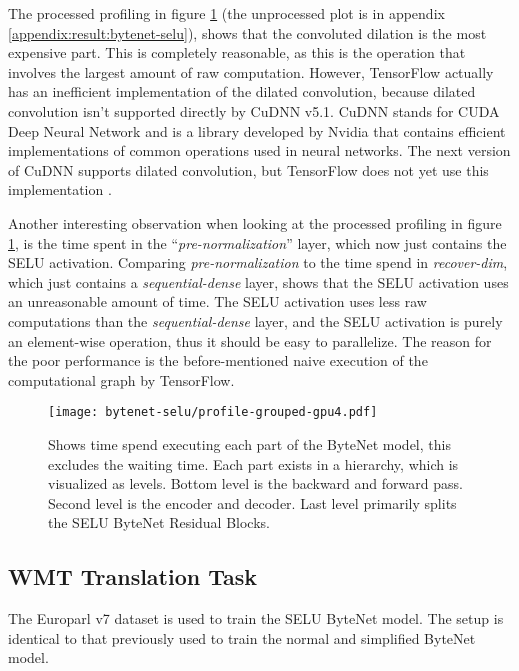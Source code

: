 The processed profiling in figure \ref{fig:result:selu-bytenet:profile-grouped} (the unprocessed plot is in appendix \ref{appendix:result:bytenet-selu}), shows that the convoluted dilation is the most expensive part. This is completely reasonable, as this is the operation that involves the largest amount of raw computation. However, TensorFlow actually has an inefficient implementation of the dilated convolution, because dilated convolution isn't supported directly by CuDNN v5.1. CuDNN stands for CUDA Deep Neural Network and is a library developed by Nvidia that contains efficient implementations of common operations used in neural networks. The next version of CuDNN supports dilated convolution, but TensorFlow does not yet use this implementation \cite{nvidia-cudnn}.

Another interesting observation when looking at the processed profiling in figure \ref{fig:result:selu-bytenet:profile-grouped}, is the time spent in the ``\textit{pre-normalization}'' layer, which now just contains the SELU activation. Comparing \textit{pre-normalization} to the time spend in \textit{recover-dim}, which just contains a \textit{sequential-dense} layer, shows that the SELU activation uses an unreasonable amount of time. The SELU activation uses less raw computations than the \textit{sequential-dense} layer, and the SELU activation is purely an element-wise operation, thus it should be easy to parallelize. The reason for the poor performance is the before-mentioned naive execution of the computational graph by TensorFlow.

\begin{figure}[h]
    \centering
    \texttt{[image: bytenet-selu/profile-grouped-gpu4.pdf]}
    \caption{Shows time spend executing each part of the ByteNet model, this excludes the waiting time. Each part exists in a hierarchy, which is visualized as levels. Bottom level is the backward and forward pass. Second level is the encoder and decoder. Last level primarily splits the SELU ByteNet Residual Blocks.}
    \label{fig:result:selu-bytenet:profile-grouped}
\end{figure}

\clearpage
\subsection{WMT Translation Task}

The Europarl v7 dataset is used to train the SELU ByteNet model. The setup is identical to that previously used to train the normal and simplified ByteNet model.

